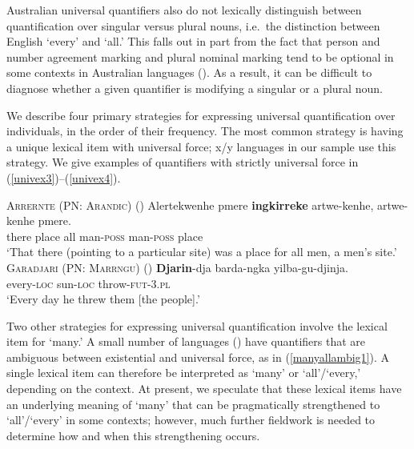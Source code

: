 \documentclass[12pt,egregdoesnotlikesansseriftitles]{scrartcl}
\begin{document}
Australian universal quantifiers also do not lexically distinguish between quantification over singular versus plural nouns, i.e.\ the distinction between English `every' and `all.' This falls out in part from the fact that person and number agreement marking and plural nominal marking tend to be optional in some contexts in Australian languages (). As a result, it can be difficult to diagnose whether a given quantifier is modifying a singular or a  plural noun. %


We describe four primary strategies for expressing universal quantification over individuals, in the order of their frequency. The most common strategy is having a unique lexical item with universal force;  x/y languages in our sample use this strategy. We give examples of quantifiers with strictly universal force in (\ref{univex3})--(\ref{univex4}).

\begin{exe}
  \ex  \textsc{Arrernte (PN: Arandic)} (\citealt[132]{wilkins89})
  \gll Alertekwenhe pmere \textbf{ingkirreke} artwe-kenhe, artwe-kenhe pmere.\\
  there place all man-\textsc{poss} man-\textsc{poss} place\\
  \glt `That there (pointing to a particular site) was a place for all men, a men's site.' \label{univex3}
  \ex  \textsc{Garadjari (PN: Marrngu)} (\citealt[48]{sands89}) 
  \gll \textbf{Djarin}-dja barda-ngka yilba-gu-djinja.\\
  every-\textsc{loc} sun-\textsc{loc}   throw-\textsc{fut}-3.\textsc{pl}\\
  \glt `Every day he threw them [the people].' \label{univex4}
\end{exe}

Two other strategies for expressing universal quantification  involve the lexical item for `many.' A small number of languages () have quantifiers that are ambiguous between existential and universal force, as in (\ref{manyallambig1}). A single lexical item can therefore be interpreted as `many' or `all'/`every,' depending on the context. At present, we speculate that these lexical items have an underlying meaning of `many' that can be pragmatically strengthened to `all'/`every' in some contexts; however, much further fieldwork is needed to determine how and when this strengthening occurs.
\end{document}
